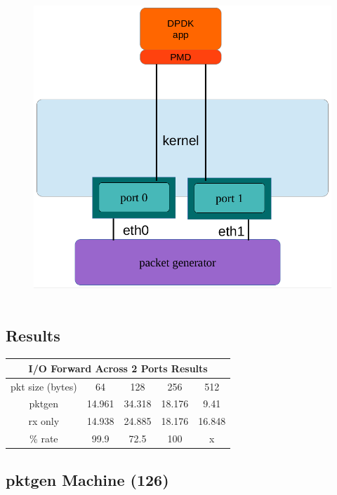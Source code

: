 \documentclass[letter]{article}
\begin{document}
{{\begin{figure}[H]
\hbox{\hspace{-0.5cm} \includegraphics[scale=0.6]{i-o-2-ports} }
\end{figure}

\subsection{Results}
\large
\begin{center}
\begin{tabular}{ |c|c|c|c|c| }
\hline
\multicolumn{5}{|c|}{I/O Forward Across 2 Ports Results} \\
 \hline
 pkt size (bytes) & 64 & 128 & 256 & 512 \\ 
\hline
 pktgen & 14.961 & 34.318 & 18.176 & 9.41  \\ 
 rx only & 14.938 & 24.885 & 18.176 & 16.848 \\ 
\hline
\rowcolor{yellow}
\% rate & 99.9 & 72.5 & 100 & x \\
 \hline
\end{tabular}
\end{center}

\subsection{pktgen Machine (126)}

}}
\end{document}
